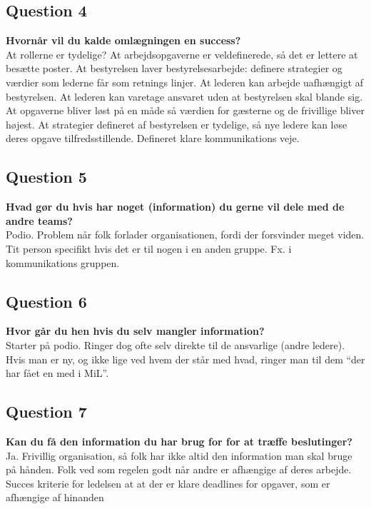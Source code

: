 \subsection{Question 4}
\label{i4q4}
\noindent \textbf{Hvornår vil du kalde omlægningen en success?} \\
At rollerne er tydelige? At arbejdsopgaverne er veldefinerede, så det er lettere at besætte poster. At bestyrelsen laver bestyrelsesarbejde: definere strategier og værdier som lederne får som retnings linjer. At lederen kan arbejde uafhængigt af bestyrelsen. At lederen kan varetage ansvaret uden at bestyrelsen skal blande sig. At opgaverne bliver løst på en måde så værdien for gæsterne og de frivillige bliver højest. At strategier defineret af bestyrelsen er tydelige, så nye ledere kan løse deres opgave tilfredsstillende. Defineret klare kommunikations veje.

\subsection{Question 5}
\label{i4q5}
\noindent \textbf{Hvad gør du hvis har noget (information) du gerne vil dele med de andre teams?} \\
Podio. Problem når folk forlader organisationen, fordi der forsvinder meget viden. Tit person specifikt hvis det er til nogen i en anden gruppe. Fx. i kommunikations gruppen.

\subsection{Question 6}
\label{i4q6}
\noindent \textbf{Hvor går du hen hvis du selv mangler information?} \\
Starter på podio. Ringer dog ofte selv direkte til de ansvarlige (andre ledere). Hvis man er ny, og ikke lige ved hvem der står med hvad, ringer man til dem “der har fået en med i MiL”.


\subsection{Question 7}
\label{i4q7}
\noindent \textbf{Kan du få den information du har brug for for at træffe beslutinger?} \\
Ja. Frivillig organisation, så folk har ikke altid den information man skal bruge på hånden. Folk ved som regelen godt når andre er afhængige af deres arbejde. 
Succes kriterie for ledelsen at at der er klare deadlines for opgaver, som er afhængige af hinanden

